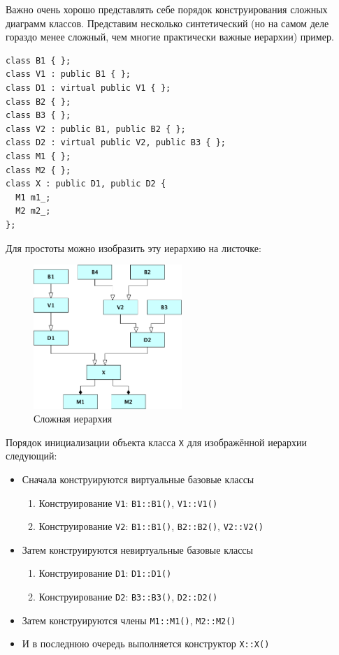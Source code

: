 \documentclass[a4paper,12pt,oneside]{article}
\begin{document}
Важно очень хорошо представлять себе порядок конструирования сложных диаграмм классов. Представим несколько синтетический (но на самом деле гораздо менее сложный, чем многие практически важные иерархии) пример.

\begin{lstlisting}
class B1 { };
class V1 : public B1 { };
class D1 : virtual public V1 { };
class B2 { };
class B3 { };
class V2 : public B1, public B2 { };
class D2 : virtual public V2, public B3 { };
class M1 { };
class M2 { };
class X : public D1, public D2 {
  M1 m1_;
  M2 m2_;
};
\end{lstlisting}

Для простоты можно изобразить эту иерархию на листочке:

\begin{figure}[h!]
\centering
\includegraphics[width=0.5\textwidth]{illustrations/complexhier-crop.pdf}
\caption{Сложная иерархия}
\label{fig:complexhier-crop}
\end{figure}

Порядок инициализации объекта класса \lstinline!X! для изображённой иерархии следующий:

\begin{itemize}
\item Сначала конструируются виртуальные базовые классы
  \begin{enumerate}
  \item Конструирование \lstinline!V1!: \lstinline!B1::B1()!, \lstinline!V1::V1()!
  \item Конструирование \lstinline!V2!: \lstinline!B1::B1()!, \lstinline!B2::B2()!, \lstinline!V2::V2()!
  \end{enumerate}
\item Затем конструируются невиртуальные базовые классы
  \begin{enumerate}
  \item Конструирование \lstinline!D1!: \lstinline!D1::D1()!
  \item Конструирование \lstinline!D2!: \lstinline!B3::B3()!, \lstinline!D2::D2()!
  \end{enumerate}
\item Затем конструируются члены \lstinline!M1::M1()!, \lstinline!M2::M2()!
\item И в последнюю очередь выполняется конструктор \lstinline!X::X()!
\end{itemize}
\end{document}
